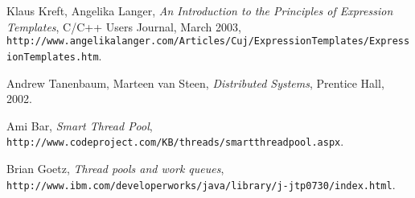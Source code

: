\begin{thebibliography}{99}
 Klaus Kreft, Angelika Langer, \textit{An Introduction to the Principles of Expression Templates}, C/C++ Users Journal, March 2003, \texttt{http://www.angelikalanger.com/Articles/Cuj/ExpressionTemplates/ExpressionTemplates.htm}.

 Andrew Tanenbaum, Marteen van Steen, \textit{Distributed Systems}, Prentice Hall, 2002.

 Ami Bar, \textit{Smart Thread Pool}, \texttt{http://www.codeproject.com/KB/threads/smartthreadpool.aspx}.

 Brian Goetz, \textit{Thread pools and work queues}, \texttt{http://www.ibm.com/developerworks/java/library/j-jtp0730/index.html}.
\end{thebibliography}